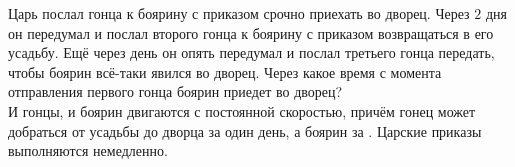 Царь послал гонца к боярину с приказом срочно приехать во дворец. Через $2$ дня он передумал и послал второго гонца к боярину с приказом возвращаться в его усадьбу. Ещё через день он опять передумал и послал третьего гонца передать, чтобы боярин всё-таки явился во дворец. Через какое время с момента отправления первого гонца боярин приедет во дворец?\\
И гонцы, и боярин двигаются с постоянной скоростью, причём гонец может добраться от усадьбы до дворца за один день, а боярин за . Царские приказы выполняются немедленно.